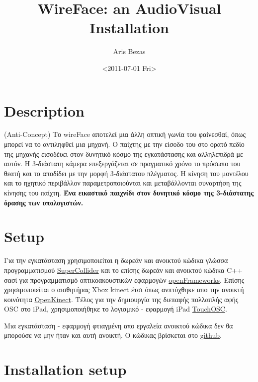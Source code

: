 \documentclass[08pt, a4paper]{scrartcl}
\begin{document}
\title{WireFace: an AudioVisual Installation}
\author{Aris Bezas}
\date{<2011-07-01 Fri>}
\maketitle

\setcounter{tocdepth}{3}
\tableofcontents
\vspace*{1cm}



\section{Description}
\label{sec-1}

(Anti-Concept) 
Το wireFace αποτελεί μια άλλη οπτική γωνία του φαίνεσθαί, όπως μπορεί να το αντιληφθεί 
μια μηχανή. Ο παίχτης με την είσοδο του στο ορατό πεδίο της μηχανής εισοδέυει στον 
δυνητικό κόσμο της εγκατάστασης και αλληλεπιδρά με αυτόν. Η 3-διάστατη κάμερα 
επεξεργάζεται σε πραγματικό χρόνο το πρόσωπο του θεατή και το αποδίδει με την μορφή 
3-διάστατου πλέγματος. Η κίνηση του μοντέλου και το ηχητικό περιβάλλον παραμετροποιούνται 
και μεταβάλλονται συναρτήση της κίνησης του παίχτη. 
\textbf{Ένα εικαστικό παιχνίδι στον δυνητικό κόσμο της 3-διάστατης όρασης των υπολογιστών.}
\section{Setup}
\label{sec-2}

Για την εγκατάσταση χρησιμοποιείται η δωρεάν και ανοικτού κώδικα γλώσσα προγραμματισμού
 \href{http://supercollider.sourceforge.net/}{SuperCollider} και το επίσης δωρεάν και ανοικτού κώδικα C++ σασί για προγραμματισμό οπτικοακουστικών 
εφαρμογών \href{http://www.openframeworks.cc/}{openFrameworks}. Επίσης χρησιμοποιείται ο αισθητήρας Xbox kinect έτσι 
όπως ανπτύχθηκε απο την ανοικτή κοινότητα \href{http://openkinect.org/wiki/Main_Page}{OpenKinect}. Τέλος για την δημιουργία της διεπαφής πολλαπλής αφής OSC
στο iPad, χρησιμοποιήθηκε το λογισμικό - εφαρμογή iPad  \href{http://hexler.net/software/touchosc}{TouchOSC}.

Μια εγκατάσταση - εφαρμογή φτιαγμένη απο εργαλεία ανοικτού κώδικα δεν θα μπορούσε να μην ήταν και αυτή 
ανοικτή. Ο κώδικας βρίσκεται στο \href{https://github.com/igoumeninja/WireFace}{github}.
\section{Installation setup}
\label{sec-3}
\end{document}
